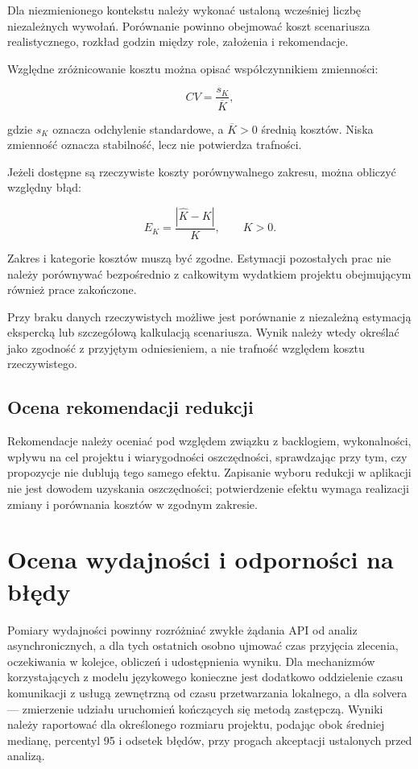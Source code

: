 Dla niezmienionego kontekstu należy wykonać ustaloną wcześniej liczbę niezależnych wywołań. Porównanie powinno obejmować koszt scenariusza realistycznego, rozkład godzin między role, założenia i rekomendacje.

Względne zróżnicowanie kosztu można opisać współczynnikiem zmienności:

\begin{equation}
    CV=\frac{s_K}{\overline{K}},
    \label{eq:testy-cv}
\end{equation}

gdzie \(s_K\) oznacza odchylenie standardowe, a \(\overline{K}>0\) średnią kosztów. Niska zmienność oznacza stabilność, lecz nie potwierdza trafności.

Jeżeli dostępne są rzeczywiste koszty porównywalnego zakresu, można obliczyć względny błąd:

\begin{equation}
    E_K =
    \frac{|\hat{K}-K|}{K},
    \qquad K>0.
    \label{eq:testy-blad-kosztu}
\end{equation}

Zakres i kategorie kosztów muszą być zgodne. Estymacji pozostałych prac nie należy porównywać bezpośrednio z całkowitym wydatkiem projektu obejmującym również prace zakończone.

Przy braku danych rzeczywistych możliwe jest porównanie z niezależną estymacją ekspercką lub szczegółową kalkulacją scenariusza. Wynik należy wtedy określać jako zgodność z przyjętym odniesieniem, a nie trafność względem kosztu rzeczywistego.

\subsection{Ocena rekomendacji redukcji}

Rekomendacje należy oceniać pod względem związku z backlogiem, wykonalności, wpływu na cel projektu i wiarygodności oszczędności, sprawdzając przy tym, czy propozycje nie dublują tego samego efektu. Zapisanie wyboru redukcji w aplikacji nie jest dowodem uzyskania oszczędności; potwierdzenie efektu wymaga realizacji zmiany i porównania kosztów w zgodnym zakresie.

\section{Ocena wydajności i odporności na błędy}

Pomiary wydajności powinny rozróżniać zwykłe żądania API od analiz asynchronicznych, a dla tych ostatnich osobno ujmować czas przyjęcia zlecenia, oczekiwania w kolejce, obliczeń i udostępnienia wyniku. Dla mechanizmów korzystających z modelu językowego konieczne jest dodatkowo oddzielenie czasu komunikacji z usługą zewnętrzną od czasu przetwarzania lokalnego, a dla solvera — zmierzenie udziału uruchomień kończących się metodą zastępczą. Wyniki należy raportować dla określonego rozmiaru projektu, podając obok średniej medianę, percentyl 95 i odsetek błędów, przy progach akceptacji ustalonych przed analizą.

